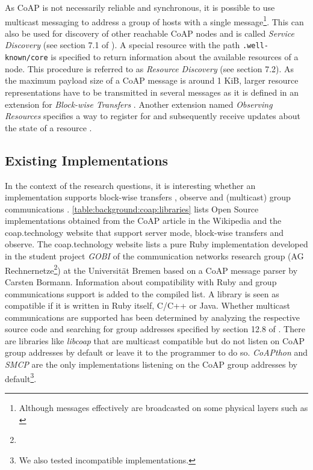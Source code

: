 	As \ac{CoAP} is not necessarily reliable and synchronous, it is possible to
	use multicast messaging to address a group of hosts with a single
	message\footnote{Although messages effectively are broadcasted on some
	physical layers such as \cite{802-15-4}}. This can also be used for
	discovery of other reachable \ac{CoAP} nodes and is called \emph{Service
	Discovery} (see section 7.1 of \cite{coap}). A special resource with the
	path \texttt{.well-known/core} is specified to return information about the
	available resources of a node. This procedure is referred to as
	\emph{Resource Discovery} (see section 7.2). As the maximum payload size of
	a \ac{CoAP} message is around 1 KiB, larger resource representations have
	to be transmitted in several messages as it is defined in an extension for
	\emph{Block-wise Transfers} \cite{block}. Another extension named
	\emph{Observing Resources} specifies a way to register for and subsequently
	receive updates about the state of a resource \cite{observe}.

	\subsection{Existing Implementations}
	\label{cha:background:coap:implementations}

		In the context of the research questions, it is interesting whether an
		implementation supports block-wise transfers \cite{block}, observe
		\cite{observe} and (multicast) group communications \cite{coap-group}.
		\autoref{table:background:coap:libraries} lists Open Source
		implementations obtained from the \ac{CoAP} article in the Wikipedia
		\cite{coap-list-1} and the coap.technology website \cite{coap-list-2}
		that support server mode, block-wise transfers and observe. The
		coap.technology website lists a pure Ruby implementation developed in
		the student project \emph{GOBI} of the communication networks research
		group (AG Rechnernetze\footnote{\urlAgrn}) at the Universität Bremen
		based on a \ac{CoAP} message parser by Carsten Bormann. Information
		about compatibility with Ruby and group communications support is added
		to the compiled list. A library is seen as compatible if it is written
		in Ruby itself, C/C++ or Java. Whether multicast communications are
		supported has been determined by analyzing the respective source code
		and searching for group addresses specified by section 12.8 of
		\cite{coap-group}. There are libraries like \emph{libcoap} that are
		multicast compatible but do not listen on \ac{CoAP} group addresses by
		default or leave it to the programmer to do so. \emph{CoAPthon} and
		\emph{SMCP} are the only implementations listening on the \ac{CoAP}
		group addresses by default\footnote{We also tested incompatible
		implementations.}.

